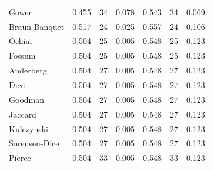 \begin{table}[t]
{\begin{tabular}{lrrrrrr}
Gower & 0.455 & 34 & 0.078 & 0.543 & 34 & 0.069 \\
Braun-Banquet & 0.517 & 24 & 0.025 & 0.557 & 24 & 0.106 \\
Ochiai & 0.504 & 25 & 0.005 & 0.548 & 25 & 0.123 \\
Fossum & 0.504 & 25 & 0.005 & 0.548 & 25 & 0.123 \\
Anderberg & 0.504 & 27 & 0.005 & 0.548 & 27 & 0.123 \\
Dice & 0.504 & 27 & 0.005 & 0.548 & 27 & 0.123 \\
Goodman & 0.504 & 27 & 0.005 & 0.548 & 27 & 0.123 \\
Jaccard & 0.504 & 27 & 0.005 & 0.548 & 27 & 0.123 \\
Kulczynski & 0.504 & 27 & 0.005 & 0.548 & 27 & 0.123 \\
Sorensen-Dice & 0.504 & 27 & 0.005 & 0.548 & 27 & 0.123 \\
Pierce & 0.504 & 33 & 0.005 & 0.548 & 33 & 0.123 \\
\bottomrule
\end{tabular}
}
\end{table}
